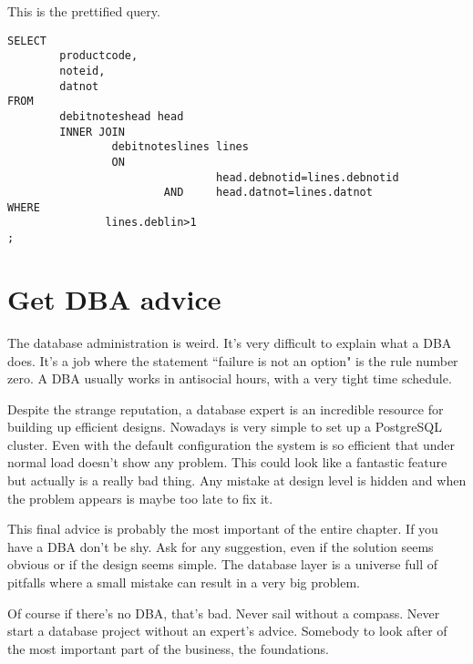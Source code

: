 This is the prettified query.

\begin{lstlisting}[style=pgsql]
SELECT
        productcode,
        noteid,
        datnot
FROM
        debitnoteshead head
        INNER JOIN
                debitnoteslines lines
                ON
                                head.debnotid=lines.debnotid
                        AND     head.datnot=lines.datnot
WHERE
               lines.deblin>1
;
\end{lstlisting}


\section{Get DBA advice}
\label{sec:GETDBA}
The database administration is weird. It's very difficult to explain what a DBA does. It's a job
where the statement ``failure is not an option" is the rule number zero. A DBA usually works in
antisocial hours, with a very tight time schedule.\newline

Despite the strange reputation, a database expert is an incredible resource for building up
efficient designs. Nowadays is very simple to set up a PostgreSQL cluster. Even with the default
configuration the system is so efficient that under normal load doesn't show any problem. This could look
like a fantastic feature but actually is a really bad thing. Any mistake at design level is hidden and when
the problem appears is maybe too late to fix it.\newline

This final advice is probably the most important of the entire chapter. If you have a DBA don't be
shy. Ask for any suggestion, even if the solution seems obvious or if the design seems simple. The
database layer is a universe full of pitfalls where a small mistake can result in a very big
problem.\newline

Of course if there's no DBA, that's bad. Never sail without a compass. Never start a database
project without an expert's advice. Somebody to look after of the most important part of the business, the
foundations.\newline

